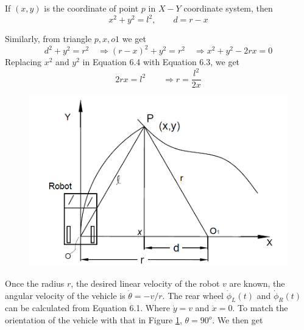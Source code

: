 If $(x,y)$ is the coordinate of point $p$ in $X-Y$ coordinate system, then 
\begin{equation}
x^2+y^2=l^2, \quad \quad d=r-x
\end{equation}

Similarly, from triangle $p, x, o1$ we get
\begin{equation}
d^2+y^2=r^2\quad \Rightarrow (r-x)^2+y^2=r^2 \quad \Rightarrow x^2+y^2-2rx=0
\end{equation}
Replacing $x^2$ and $y^2$ in Equation 6.4 with Equation 6.3, we get
\begin{equation}
2rx=l^2\quad \quad \Rightarrow r=\frac{l^2}{2x}
\end{equation}
\begin{figure}
	\includegraphics[width=\linewidth,keepaspectratio]{Chapter6/fig/purepesuitgeometry2}
	\label{fig:purePGeo} 
\end{figure}

Once the radius $r$, the desired  linear velocity of the robot $v$ are known, the angular velocity of the vehicle is $\dot{\theta}=-v/r$. The rear wheel  $\dot{\phi}_L(t)$ and $\dot{\phi}_R(t)$ can be calculated from Equation 6.1. Where $\dot{y}=v$ and $\dot{x}=0$. To match the orientation of the vehicle with that in  Figure \ref{fig:purePGeo}, $\theta=90^o$. We then get


